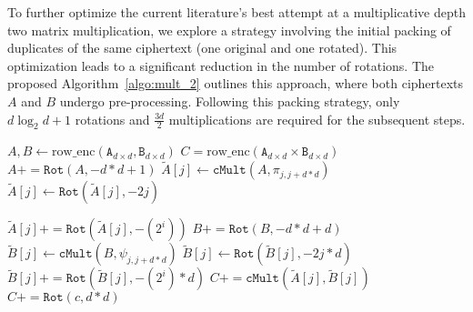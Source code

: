 \documentclass[journal=tosc,final]{iacrtrans}
\begin{document}
To further optimize the current literature's best attempt at a multiplicative depth two matrix multiplication, we explore a strategy involving the initial packing of duplicates of the same ciphertext (one original and one rotated). This optimization leads to a significant reduction in the number of rotations. The proposed Algorithm~\ref{algo:mult_2} outlines this approach, where both ciphertexts $A$ and $B$ undergo pre-processing. Following this packing strategy, only $d\log_2{d}+1$ rotations and $\frac{3d}{2}$ multiplications are required for the subsequent steps.
\begin{algorithm}
    \renewcommand{\algorithmicensure}{\textbf{Out:}}
    \caption{$\mathtt{Optimized.Matrix.Mult}$ }
    \begin{algorithmic}[1]
        \Require $A,B \gets \text{row\_enc}(\mathtt{A}_{d\times d},\mathtt{B}_{d\times d})$
        \Ensure  $C=\text{row\_enc}(\mathtt{A}_{d\times d}\times\mathtt{B}_{d\times d})$ 
        \Statex \LeftComment{\textcolor{gray}{// Preprocess $A$ }}
        \State $A +=  \texttt{Rot}(A, -d*d+1 )$
        \State $\tilde{A}[j] \gets  \texttt{cMult}(A, \pi_{j,j+d*d} )$ \Comment{\textcolor{gray}{Splitting $A$ column-wise}}
        \State $\tilde{A}[j] \gets  \texttt{Rot}(\tilde{A}[j],-2j)$ \Comment{\textcolor{gray}{ Right align all the columns}}
        
        	\Comment{\textcolor{gray}{ Replicate the column}}
        \State $\tilde{A}[j] +=  \texttt{Rot}(\tilde{A}[j], -(2^i) )$
     \EndFor
     \EndFor
     \Statex \LeftComment{\textcolor{gray}{// Preprocess $B$ }}
     \State $B +=  \texttt{Rot}(B, -d*d+d )$
        \State $\tilde{B}[j] \gets  \texttt{cMult}(B, \psi_{j,j+d*d} )$ \Comment{\textcolor{gray}{ Splitting $B$ row-wise}}
        \State $\tilde{B}[j] \gets  \texttt{Rot}(\tilde{B}[j],-2j*d)$ \Comment{\textcolor{gray}{Top align all the rows}}
        	\Comment{\textcolor{gray}{ Replicate the rows}}
        \State $\tilde{B}[j] +=  \texttt{Rot}(\tilde{B}[j], -(2^i)*d )$
     \EndFor
     \EndFor
     \Statex \LeftComment{\textcolor{gray}{// Compute $C$ }}
        \State $C += \texttt{cMult}(\tilde{A}[j],\tilde{B}[j] )$ 
     \EndFor
     \State $C += \texttt{Rot}(c,d* d )$
    \end{algorithmic}\label{algo:mult_2}
    \end{algorithm}
\end{document}
